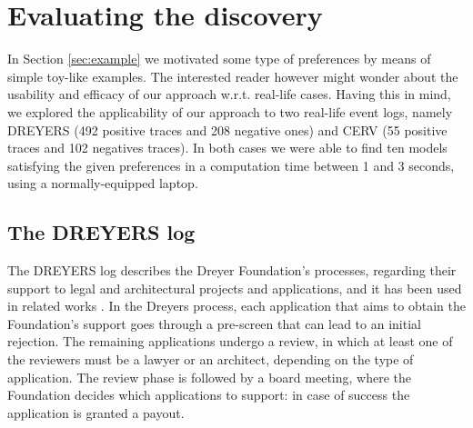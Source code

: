 









\section{Evaluating the discovery}
\label{sec:evaluation}


In Section \ref{sec:example} we motivated some type of preferences by means of simple toy-like examples. The interested reader however might wonder about the usability and efficacy of our approach w.r.t. real-life cases. Having this in mind, we explored the applicability of our approach to two real-life event logs, namely DREYERS (492 positive traces and 208 negative ones) and CERV (55 positive traces and 102 negatives traces). In both cases we were able to find ten models satisfying the given preferences in a computation time between 1 and 3 seconds, using a normally-equipped laptop.



\subsection{The DREYERS log}
\label{subsec:dreyers}

The DREYERS log describes the Dreyer Foundation’s processes, regarding their support to legal and architectural projects and applications, and it has been used in related works \cite{DBLP:conf/ssci/DeboisS15,DBLP:conf/bpm/SlaatsDB21}. In the Dreyers process, each application that aims to obtain the Foundation's support goes through a pre-screen that can lead to an initial rejection. The remaining applications undergo a review, in which at least one of the reviewers must be a lawyer or an architect, depending on the type of application. The review phase is followed by a board meeting, where the Foundation decides which applications to support: in case of success the application is granted a payout.

